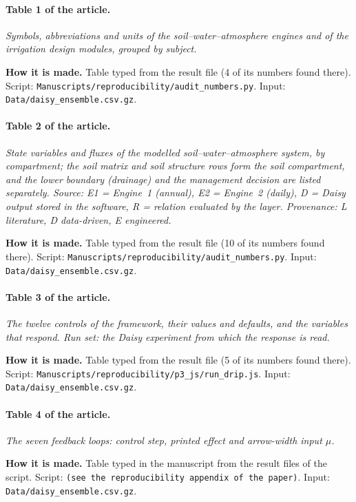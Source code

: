\paragraph{Table 1 of the article.} \emph{Symbols, abbreviations and units of the soil--water--atmosphere engines and of the irrigation design modules, grouped by subject.}

\textbf{How it is made.} Table typed from the result file (4 of its numbers found there). Script: \nolinkurl{Manuscripts/reproducibility/audit_numbers.py}. Input: \nolinkurl{Data/daisy_ensemble.csv.gz}.

\paragraph{Table 2 of the article.} \emph{State variables and fluxes of the modelled soil--water--atmosphere system, by compartment; the soil matrix and soil structure rows form the soil compartment, and the lower boundary (drainage) and the management decision are listed separately. Source: E1 = Engine~1 (annual), E2 = Engine~2 (daily), D = Daisy output stored in the software, R = relation evaluated by the layer. Provenance: L literature, D data-driven, E engineered.}

\textbf{How it is made.} Table typed from the result file (10 of its numbers found there). Script: \nolinkurl{Manuscripts/reproducibility/audit_numbers.py}. Input: \nolinkurl{Data/daisy_ensemble.csv.gz}.

\paragraph{Table 3 of the article.} \emph{The twelve controls of the framework, their values and defaults, and the variables that respond. Run set: the Daisy experiment from which the response is read.}

\textbf{How it is made.} Table typed from the result file (5 of its numbers found there). Script: \nolinkurl{Manuscripts/reproducibility/p3_js/run_drip.js}. Input: \nolinkurl{Data/daisy_ensemble.csv.gz}.

\paragraph{Table 4 of the article.} \emph{The seven feedback loops: control step, printed effect and arrow-width input $\mu$.}

\textbf{How it is made.} Table typed in the manuscript from the result files of the script. Script: \nolinkurl{(see the reproducibility appendix of the paper)}. Input: \nolinkurl{Data/daisy_ensemble.csv.gz}.


